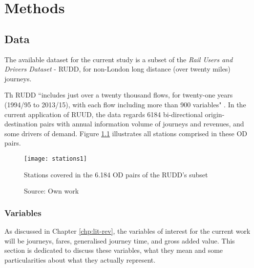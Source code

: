 \chapter{Methods}
\label{chp:methods}

\section{Data}

The available dataset for the current study is a subset of the \textit{Rail Users and Drivers Dataset} - RUDD, for non-London long distance (over twenty miles) journeys. 

Th RUDD ``includes just over a twenty thousand flows, for twenty-one years (1994/95 to 2013/15), with each flow including more than 900 variables" \citep[p.~135]{systra_rand}. In the current application of RUUD, the data regards 6184 bi-directional origin-destination pairs with annual information volume of journeys and revenues, and some drivers of demand. Figure \ref{fig:stations} illustrates all stations comprised in these OD pairs.


\begin{figure}[H]
\centering
\texttt{[image: stations1]}
\caption{Stations covered in the 6.184 OD pairs of the RUDD's subset}
\label{fig:stations}
\caption*{Source: Own work}
\end{figure} 


\subsection{Variables}

As discussed in Chapter \ref{chp:lit-rev}, the variables of interest for the current work will be journeys, fares, generalised journey time, and gross added value. This section is dedicated to discuss these variables, what they mean and some particularities about what they actually represent. 

